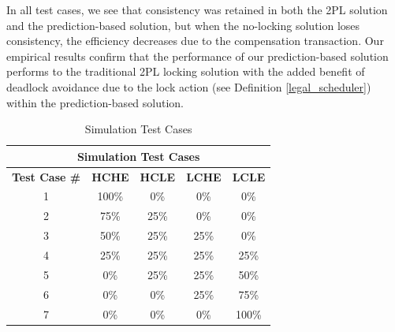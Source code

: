 In all test cases, we see that consistency was retained in both the 2PL solution and the prediction-based solution, but when the no-locking solution loses consistency, the efficiency decreases due to the compensation transaction. Our empirical results confirm that the performance of our prediction-based solution performs to the traditional 2PL locking solution with the added benefit of deadlock avoidance due to the lock action (see Definition \ref{legal_scheduler}) within the prediction-based solution.

\begin{table}[h]
\captionsetup{justification=centering}
\centering
\begin{tabular}{|c|c|c|c|c|}
\hline
\multicolumn{5}{|c|}{\cellcolor[HTML]{EFEFEF}\textbf{Simulation Test Cases}}                                                   \\ \hline
\textbf{Test Case \#} & \textbf{HCHE} & \textbf{HCLE} & \textbf{LCHE} & \textbf{LCLE} \\ \hline
1 & 100\% & 0\% & 0\% & 0\% \\ \hline
2 & 75\% & 25\% & 0\% & 0\% \\ \hline
3 & 50\% & 25\% & 25\% & 0\% \\ \hline
4 & 25\% & 25\% & 25\% & 25\% \\ \hline
5 & 0\% & 25\% & 25\% & 50\% \\ \hline
6 & 0\% & 0\% & 25\% & 75\% \\ \hline
7 & 0\% & 0\% & 0\% & 100\% \\ \hline
\end{tabular}

\caption{Simulation Test Cases} %
\label{tbl:sim_test_cases} %

\end{table}

